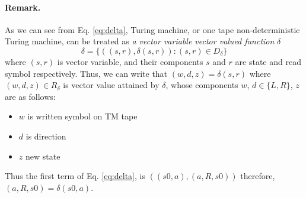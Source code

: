 \documentclass[12pt, a4paper, bibliography=totocnumbered]{report}
\begin{document}
	\paragraph{Remark.} As we can see from Eq. \eqref{eq:delta}, Turing machine, or one tape non-deterministic Turing machine, can be treated as \emph{a vector variable vector valued function} $ \delta $
	\begin{equation}\label{key}
		\delta = \{((s, r), \delta(s, r)) : (s, r) \in D_{\delta} \} 
	\end{equation}
	where $ (s, r) $ is vector variable, and their components $ s $ and $ r $ are state and read symbol respectively. Thus, we can write that $ (w, d, z) = \delta(s, r) $ where $ (w, d, z) \in R_{\delta} $ is vector value attained by $ \delta $, whose components   $ w $, $ d \in \{L, R\} $, $ z $ are as follows:
	\begin{itemize}
		\item $ w $ is  written symbol on TM tape
		\item $ d $ is direction
		\item $ z $ new state
	\end{itemize}
	Thus the first term of Eq. \eqref{eq:delta}, is $ ((s0, a), (a, R, s0)) $ therefore, $ (a, R, s0) =\delta(s0, a) $.
	
\end{document}
